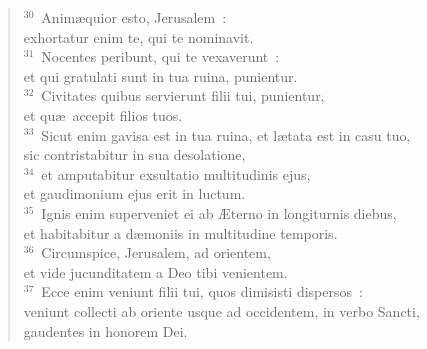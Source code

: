 \begin{flushleft}\begin{verse}${}^{30}$~Anim\ae quior esto, Jerusalem~:\\ exhortatur enim te, qui te nominavit.\\
${}^{31}$~Nocentes peribunt, qui te vexaverunt~:\\ et qui gratulati sunt in tua ruina, punientur.\\
${}^{32}$~Civitates quibus servierunt filii tui, punientur,\\ et qu\ae\ accepit filios tuos.\\
${}^{33}$~Sicut enim gavisa est in tua ruina, et l\ae tata est in casu tuo,\\ sic contristabitur in sua desolatione,\\
${}^{34}$~et amputabitur exsultatio multitudinis ejus,\\ et gaudimonium ejus erit in luctum.\\
${}^{35}$~Ignis enim superveniet ei ab \AE terno in longiturnis diebus,\\ et habitabitur a d\ae moniis in multitudine temporis.\\
${}^{36}$~Circumspice, Jerusalem, ad orientem,\\ et vide jucunditatem a Deo tibi venientem.\\
${}^{37}$~Ecce enim veniunt filii tui, quos dimisisti dispersos~:\\ veniunt collecti ab oriente usque ad occidentem, in verbo Sancti,\\ gaudentes in honorem Dei.\end{verse}\end{flushleft}



